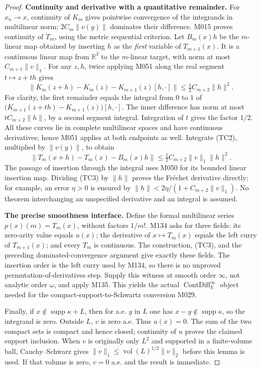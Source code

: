 \documentclass[11pt,a4paper]{article}
\theoremstyle{definition}
\theoremstyle{remark}
\begin{document}
\begin{proof}
\textbf{Continuity and derivative with a quantitative remainder.}
For $x_n\to x$, continuity of $K_m$ gives pointwise convergence of the
integrands in multilinear norm; $2C_m\|v(y)\|$ dominates their difference.
M015 proves continuity of $T_m$, using the metric sequential criterion.
Let $B_m(x)h$ be the $m$-linear map obtained by inserting $h$ as the
\emph{first} variable of $T_{m+1}(x)$. It is a continuous linear map
from $\mathbb R^3$ to the $m$-linear target, with norm at most
$C_{m+1}\|v\|_1$. For any $z,h$, twice applying M051 along the real
segment $t\mapsto z+th$ gives
\[
 \|K_m(z+h)-K_m(z)-K_{m+1}(z)[h,\cdot]\|
       \leq\tfrac12 C_{m+2}\|h\|^2.                     \tag{TC2}
\]
For clarity, the first remainder equals the integral from $0$ to $1$
of $\bigl(K_{m+1}(z+th)-K_{m+1}(z)\bigr)[h,\cdot]$.
The inner difference has norm at most $tC_{m+2}\|h\|$, by a second
segment integral. Integration of $t$ gives the factor $1/2$.
All these curves lie in complete multilinear spaces and have continuous
derivatives; hence M051 applies at both endpoints as well.
Integrate (TC2), multiplied by $\|v(y)\|$, to obtain
\[
 \|T_m(x+h)-T_m(x)-B_m(x)h\|
 \leq\tfrac12 C_{m+2}\|v\|_1\|h\|^2.                  \tag{TC3}
\]
The passage of insertion through the integral uses M050 for its bounded
linear insertion map. Dividing (TC3) by $\|h\|$ proves the Fr\'echet
derivative directly; for example, an error $\eta>0$ is ensured by
$\|h\|<2\eta/(1+C_{m+2}\|v\|_1)$. No theorem interchanging an
unspecified derivative and an integral is assumed.

\textbf{The precise smoothness interface.}
Define the formal multilinear series $p(x)(m)=T_m(x)$, without factors
$1/m!$. M134 asks for three fields: its zero-arity value equals $u(x)$;
the derivative of $x\mapsto T_m(x)$ equals the left curry of
$T_{m+1}(x)$; and every $T_m$ is continuous. The construction, (TC3),
and the preceding dominated-convergence argument give exactly these
fields. The insertion order is the left curry used by M134, so there is
no unproved permutation-of-derivatives step. Supply this witness at
smooth order $\infty$, not analytic order $\omega$, and apply M135.
This yields the actual $\operatorname{ContDiff}_{\mathbb R}^{\infty}$
object needed for the compact-support-to-Schwartz conversion M029.

Finally, if $x\notin\operatorname{supp}\kappa+L$, then for a.e. $y$ in
$L$ one has $x-y\notin\operatorname{supp}\kappa$, so the integrand is
zero. Outside $L$, $v$ is zero a.e. Thus $u(x)=0$. The sum of the two
compact sets is compact and hence closed; continuity of $u$ proves the
claimed support inclusion. When $v$ is originally only $L^2$ and
supported in a finite-volume ball, Cauchy--Schwarz gives
$\|v\|_1\leq\operatorname{vol}(L)^{1/2}\|v\|_2$ before this lemma is
used. If that volume is zero, $v=0$ a.e. and the result is immediate.
\end{proof}
\end{document}
